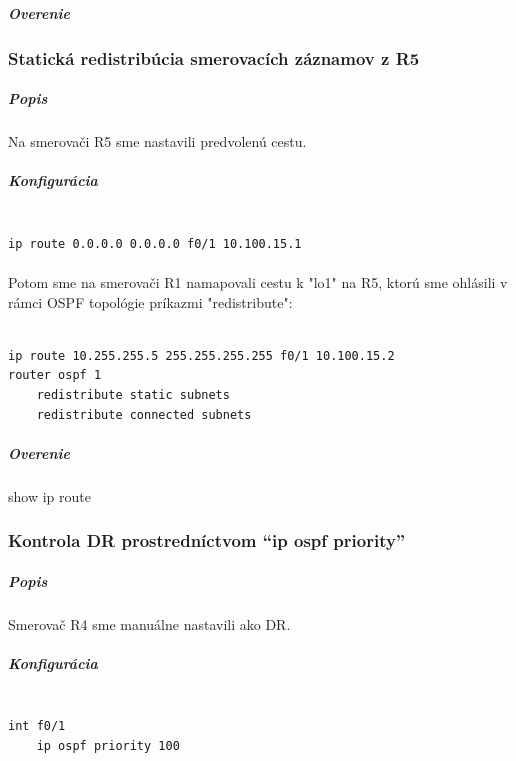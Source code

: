 \documentclass[12pt,twoside,a4paper]{article}
\begin{document}
\subparagraph{Overenie}
\subparagraph{}



\subsubsection*{Statická redistribúcia smerovacích záznamov z R5}
\subparagraph{Popis}
\subparagraph{}
Na smerovači R5 sme nastavili predvolenú cestu.

\subparagraph{Konfigurácia}
\noindent
{\selectfont
\begin{small}
\begin{verbatim}

ip route 0.0.0.0 0.0.0.0 f0/1 10.100.15.1

\end{verbatim}
\end{small}
}

\paragraph{}
Potom sme na smerovači R1 namapovali cestu k "lo1" na R5, ktorú sme ohlásili v rámci OSPF topológie príkazmi "redistribute":

\noindent
{\selectfont
\begin{small}
\begin{verbatim}

ip route 10.255.255.5 255.255.255.255 f0/1 10.100.15.2
router ospf 1
    redistribute static subnets
    redistribute connected subnets

\end{verbatim}
\end{small}
}

\subparagraph{Overenie}
\subparagraph{}

\noindent
show ip route



\subsubsection*{Kontrola DR prostredníctvom  “ip ospf priority”}
\subparagraph{Popis}
\subparagraph{}
Smerovač R4 sme manuálne nastavili ako DR.

\subparagraph{Konfigurácia}
\noindent
{\selectfont
\begin{small}
\begin{verbatim}

int f0/1
    ip ospf priority 100

\end{verbatim}
\end{small}
}
\end{document}
